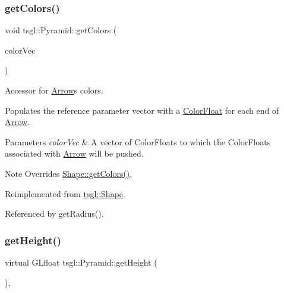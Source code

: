 \subsubsection{\texorpdfstring{get\+Colors()}{getColors()}}
{\footnotesize\ttfamily void tsgl\+::\+Pyramid\+::get\+Colors (\begin{DoxyParamCaption}\item[{std\+::vector$<$ \hyperlink{structtsgl_1_1_color_float}{Color\+Float} $>$ \&}]{color\+Vec }\end{DoxyParamCaption})\hspace{0.3cm}{\ttfamily [virtual]}}



Accessor for \hyperlink{classtsgl_1_1_arrow}{Arrow}\textquotesingle{}s colors. 

Populates the reference parameter vector with a \hyperlink{structtsgl_1_1_color_float}{Color\+Float} for each end of \hyperlink{classtsgl_1_1_arrow}{Arrow}. 
\begin{DoxyParams}{Parameters}
{\em color\+Vec} & A vector of Color\+Floats to which the Color\+Floats associated with \hyperlink{classtsgl_1_1_arrow}{Arrow} will be pushed. \\
\hline
\end{DoxyParams}
\begin{DoxyNote}{Note}
Overrides \hyperlink{classtsgl_1_1_shape_a6f54fe4d049f69a287edf8335a9509f8}{Shape\+::get\+Colors()}. 
\end{DoxyNote}


Reimplemented from \hyperlink{classtsgl_1_1_shape_a6f54fe4d049f69a287edf8335a9509f8}{tsgl\+::\+Shape}.



Referenced by get\+Radius().

\mbox{\label{classtsgl_1_1_pyramid_a4511f7d6a89b061a83dc0fda00ff0c31}} 
\subsubsection{\texorpdfstring{get\+Height()}{getHeight()}}
{\footnotesize\ttfamily virtual G\+Lfloat tsgl\+::\+Pyramid\+::get\+Height (\begin{DoxyParamCaption}{ }\end{DoxyParamCaption})\hspace{0.3cm}{\ttfamily [inline]}, {\ttfamily [virtual]}}



